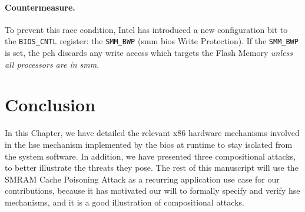 \paragraph{Countermeasure.}
%
To prevent this race condition, Intel has introduced a new configuration bit to
the \texttt{BIOS\_CNTL} register: the \texttt{SMM\_BWP} (\ac{smm} \ac{bios}
Write Protection).
%
If the \texttt{SMM\_BWP} is set, the \ac{pch} discards any write access which
targets the Flash Memory \emph{unless all processors are in \ac{smm}}.

\section{Conclusion}
\label{sec:usecase:conclusion}

In this Chapter, we have detailed the relevant x86 hardware mechanisms involved
in the \ac{hse} mechanism implemented by the \ac{bios} at runtime to stay
isolated from the system software.
%
In addition, we have presented three compositional attacks, to better illustrate
the threats they pose.
%
The rest of this manuscript will use the SMRAM Cache Poisoning Attack as a
recurring application use case for our contributions, because it has motivated
our will to formally specify and verify \ac{hse} mechanisms, and it is a good
illustration of compositional attacks.
